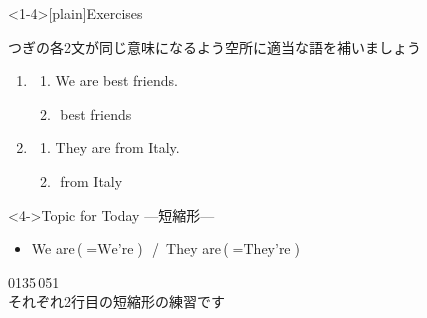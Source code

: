 \documentclass[aspectratio=169,xcolor={dvipsnames,table}]{beamer}
\begin{document}
%
\begin{frame}<1-4>[plain]{Exercises}

 {\small つぎの各2文が同じ意味になるよう空所に適当な語を補いましょう}

\begin{enumerate}
 \item \begin{enumerate}
	\item We are best friends.
	\item {}\,\,best friends
       \end{enumerate}
 \item \begin{enumerate}
	\item They are from Italy.
	\item {}\,\,from Italy        \end{enumerate}
\end{enumerate}

\vfill

\begin{block}<4->{Topic for Today ---短縮形---}
\begin{itemize}[square]
 \item We are\,($=\text{We're}$)\,\,\,\,/\,\,\,They are\,($=\text{They're}$)
\end{itemize}
     \end{block}


\hfill{\tiny 0135}\,{\tiny {}051}\\
\hfill{\scriptsize それぞれ2行目の短縮形の練習です}

\end{frame}
\end{document}
